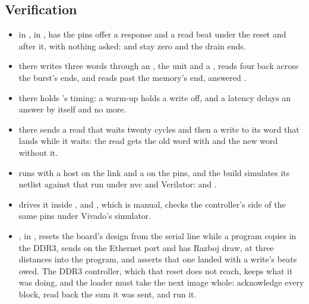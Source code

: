 \subsection*{Verification}

\begin{itemize}
\item {} in
, in , has the
pins offer a response and a read beat under the reset and after it,
with nothing asked:  and  stay zero and the drain
ends.
\item {}
there writes
three words through an , the unit and a ,
reads four back across the burst's ends, and reads past the memory's
end, answered .
\item {} there
holds 's timing: a warm-up holds a write off, and a latency
delays an answer by itself and no more.
\item {}\allowbreak
{}
there sends a read that waits twenty cycles and then a write to its
word that lands while it waits: the read gets the old word with
 and the new word without it.
\item {} runs  with
a host on the link and a  on the pins, and the build
simulates its netlist against that run under nvc and Verilator:
 and
.
\item {} drives it inside , and
, which is manual, checks the
controller's side of the same pins under Vivado's simulator.
\item {}\allowbreak
{}, in
, resets the board's design from the
serial line while a program copies in the DDR3, sends on the Ethernet
port and has Razboj draw, at three distances into the program, and
asserts that one landed with a write's beats owed. The DDR3
controller, which that reset does not reach, keeps what it was doing,
and the loader must take the next image whole: acknowledge every
block, read back the sum it was sent, and run it.
\end{itemize}

